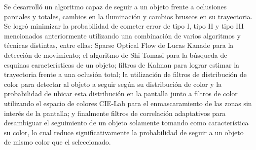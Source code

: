 Se desarrolló un algoritmo capaz de seguir a un objeto frente a oclusiones parciales y totales, cambios en la iluminación y cambios bruscos en su trayectoria. Se logró minimizar la probabilidad de cometer error de tipo I, tipo II y tipo III mencionados anteriormente utilizando una combinación de varios algoritmos y técnicas distintas, entre ellas: Sparse Optical Flow de Lucas Kanade para la detección de movimiento; el algoritmo de Shi-Tomasi para la búsqueda de esquinas características de un objeto; filtros de Kalman para lograr estimar la trayectoria frente a una oclusión total; la utilización de filtros de distribución de color para detectar al objeto a seguir según su distribución de color y la probabilidad de ubicar esta distribución en la pantalla junto a filtros de color utilizando el espacio de colores CIE-Lab para el enmascaramiento de las zonas sin interés de la pantalla; y finalmente filtros de correlación adaptativos para desambiguar el seguimiento de un objeto solamente tomando como característica su color, lo cual reduce significativamente la probabilidad de seguir a un objeto de mismo color que el seleccionado.




